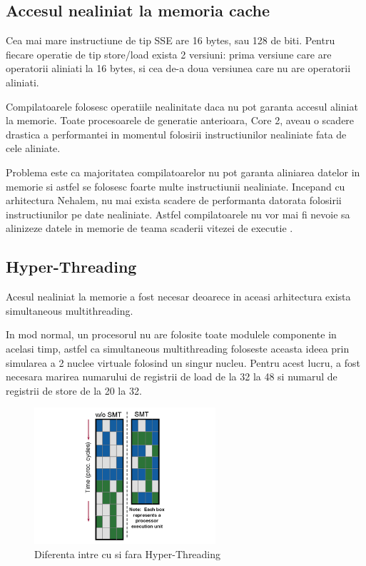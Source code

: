 \subsection{Accesul nealiniat la memoria cache}

Cea mai mare instructiune de tip SSE are 16 bytes, sau 128 de biti. Pentru fiecare operatie de tip
store/load exista 2 versiuni: prima versiune care are operatorii aliniati la 16 bytes, si cea de-a
doua versiunea care nu are operatorii aliniati.

Compilatoarele folosesc operatiile nealinitate daca nu pot garanta accesul aliniat
la memorie. Toate procesoarele de generatie anterioara, Core 2, aveau o scadere drastica a
performantei in momentul folosirii instructiunilor nealiniate fata de cele aliniate.

Problema este ca majoritatea compilatoarelor nu pot garanta aliniarea datelor in memorie si astfel
se folosesc foarte multe instructiunii nealiniate. Incepand cu arhitectura Nehalem, nu mai exista
scadere de performanta datorata folosirii instructiunilor pe date nealiniate. Astfel compilatoarele
nu vor mai fi nevoie sa alinizeze datele in memorie de teama scaderii vitezei de executie
\cite{thomadakis2011architecture}.

\subsection{Hyper-Threading}

Acesul nealiniat la memorie a fost necesar deoarece in aceasi arhitectura exista simultaneous
multithreading.

In mod normal, un procesorul nu are folosite toate modulele componente in acelasi timp, astfel ca
simultaneous multithreading foloseste aceasta ideea prin simularea a 2 nuclee virtuale folosind un
singur nucleu. Pentru acest lucru, a fost necesara marirea numarului de registrii de load de la 32
la 48 si numarul de registrii de store de la 20 la 32.

\begin{figure}[ht] \centering
\includegraphics[width=0.6\textwidth]{img/smp.png}
\caption{Diferenta intre cu si fara Hyper-Threading } \end{figure}

